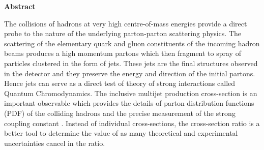 \begin{center}
{\bf \huge Abstract}
\end{center}

The collisions of hadrons at very high centre-of-mass energies provide a direct probe to the nature of the underlying parton-parton scattering physics. The scattering of the elementary quark and gluon constituents of the incoming hadron beams produces a high momentum partons which then fragment to spray of particles clustered in the form of jets. These jets are the final structures observed in the detector and they preserve the energy and direction of the initial partons. Hence jets can serve as a direct test of theory of strong interactions called Quantum Chromodynamics. The inclusive multijet production cross-section is an important observable which provides the details of parton distribution functions (PDF) of the colliding hadrons and the precise measurement of the strong coupling constant \alps. Instead of individual cross-sections, the cross-section ratio is a better tool to determine the value of \alps as many theoretical and experimental uncertainties cancel in the ratio.

